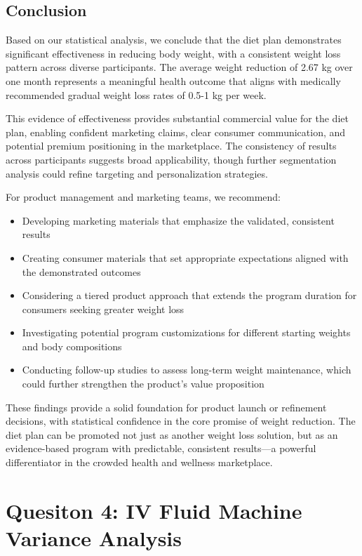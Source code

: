 \documentclass[12pt]{article}
\begin{document}
\subsection{Conclusion}
Based on our statistical analysis, we conclude that the diet plan demonstrates significant effectiveness in reducing body weight, with a consistent weight loss pattern across diverse participants. The average weight reduction of 2.67 kg over one month represents a meaningful health outcome that aligns with medically recommended gradual weight loss rates of 0.5-1 kg per week.

This evidence of effectiveness provides substantial commercial value for the diet plan, enabling confident marketing claims, clear consumer communication, and potential premium positioning in the marketplace. The consistency of results across participants suggests broad applicability, though further segmentation analysis could refine targeting and personalization strategies.

For product management and marketing teams, we recommend:

\begin{itemize}
    \item Developing marketing materials that emphasize the validated, consistent results
    \item Creating consumer materials that set appropriate expectations aligned with the demonstrated outcomes
    \item Considering a tiered product approach that extends the program duration for consumers seeking greater weight loss
    \item Investigating potential program customizations for different starting weights and body compositions
    \item Conducting follow-up studies to assess long-term weight maintenance, which could further strengthen the product's value proposition
\end{itemize}

These findings provide a solid foundation for product launch or refinement decisions, with statistical confidence in the core promise of weight reduction. The diet plan can be promoted not just as another weight loss solution, but as an evidence-based program with predictable, consistent results—a powerful differentiator in the crowded health and wellness marketplace.
\newpage
\section{Quesiton 4: IV Fluid Machine Variance Analysis}
\end{document}
